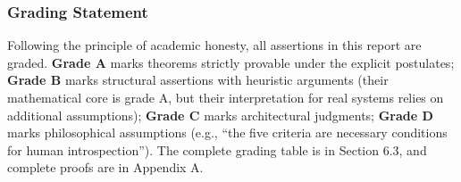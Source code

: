 \subsubsection{Grading Statement}

Following the principle of academic honesty, all assertions in this report are graded.
\textbf{Grade A} marks theorems strictly provable under the explicit postulates; \textbf{Grade B}
marks structural assertions with heuristic arguments (their mathematical core is grade A, but
their interpretation for real systems relies on additional assumptions); \textbf{Grade C} marks
architectural judgments; \textbf{Grade D} marks philosophical assumptions (e.g., ``the five
criteria are necessary conditions for human introspection''). The complete grading table is in
Section 6.3, and complete proofs are in Appendix A.
